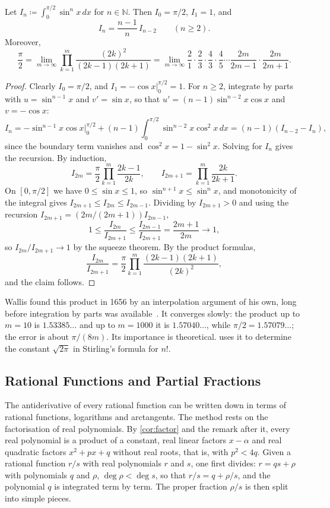 \begin{proposition}
\label{prop:wallis}
Let $I_n\coloneqq\int_0^{\pi/2}\sin^nx\,dx$ for $n\in\mathbb N$. Then $I_0=\pi/2$, $I_1=1$, and
\[
I_n=\frac{n-1}n\,I_{n-2}\qquad(n\ge2).
\]
Moreover,
\[
\frac\pi2=\lim_{m\to\infty}\prod_{k=1}^m\frac{(2k)^2}{(2k-1)(2k+1)}=\lim_{m\to\infty}\frac21\cdot\frac23\cdot\frac43\cdot\frac45\cdots\frac{2m}{2m-1}\cdot\frac{2m}{2m+1} .
\]
\end{proposition}

\begin{proof}
Clearly $I_0=\pi/2$, and $I_1=-\cos x|_0^{\pi/2}=1$. For $n\ge2$, integrate by parts with $u=\sin^{n-1}x$ and $v'=\sin x$, so that $u'=(n-1)\sin^{n-2}x\cos x$ and $v=-\cos x$:
\[
I_n=-\sin^{n-1}x\cos x\Big|_0^{\pi/2}+(n-1)\int_0^{\pi/2}\sin^{n-2}x\cos^2x\,dx=(n-1)(I_{n-2}-I_n),
\]
since the boundary term vanishes and $\cos^2x=1-\sin^2x$. Solving for $I_n$ gives the recursion. By induction,
\[
I_{2m}=\frac\pi2\prod_{k=1}^m\frac{2k-1}{2k},\qquad I_{2m+1}=\prod_{k=1}^m\frac{2k}{2k+1} .
\]
On $[0,\pi/2]$ we have $0\le\sin x\le1$, so $\sin^{n+1}x\le\sin^nx$, and monotonicity of the integral gives $I_{2m+1}\le I_{2m}\le I_{2m-1}$. Dividing by $I_{2m+1}>0$ and using the recursion $I_{2m+1}=(2m/(2m+1))I_{2m-1}$,
\[
1\le\frac{I_{2m}}{I_{2m+1}}\le\frac{I_{2m-1}}{I_{2m+1}}=\frac{2m+1}{2m}\to1 ,
\]
so $I_{2m}/I_{2m+1}\to1$ by the squeeze theorem. By the product formulas,
\[
\frac{I_{2m}}{I_{2m+1}}=\frac\pi2\prod_{k=1}^m\frac{(2k-1)(2k+1)}{(2k)^2},
\]
and the claim follows.
\end{proof}

Wallis found this product in 1656 by an interpolation argument of his own, long before integration by parts was available~\cite{edwards1979}. It converges slowly: the product up to $m=10$ is $1.53385\ldots$ and up to $m=1000$ it is $1.57040\ldots$, while $\pi/2=1.57079\ldots$; the error is about $\pi/(8m)$. Its importance is theoretical.  uses it to determine the constant $\sqrt{2\pi}$ in Stirling's formula for $n!$.

\subsection{Rational Functions and Partial Fractions}

The antiderivative of every rational function can be written down in terms of rational functions, logarithms and arctangents. The method rests on the factorisation of real polynomials. By \cref{cor:factor} and the remark after it, every real polynomial is a product of a constant, real linear factors $x-\alpha$ and real quadratic factors $x^2+px+q$ without real roots, that is, with $p^2<4q$. Given a rational function $r/s$ with real polynomials $r$ and $s$, one first divides: $r=qs+\rho$ with polynomials $q$ and $\rho$, $\deg\rho<\deg s$, so that $r/s=q+\rho/s$, and the polynomial $q$ is integrated term by term. The proper fraction $\rho/s$ is then split into simple pieces.

